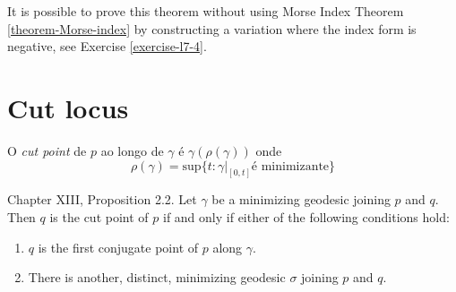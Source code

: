 It is possible to prove this theorem without
using Morse Index Theorem
\ref{theorem-Morse-index} by constructing a
variation where the index form is
negative, see Exercise \ref{exercise-l7-4}.

\section{Cut locus}
\label{section-cut-locus}

\begin{definition}
\label{definition-cut-point}
O {\it cut point} de  $p$ ao longo de
$\gamma$ é $\gamma(\rho(\gamma))$
onde
$$
\rho(\gamma)=\text{sup}\{t:\gamma|_{[0,t]}
\text{
é minimizante}\}
$$

\end{definition}

\begin{proposition}
\label{proposition-cut-point-chara}
\cite{doc} Chapter XIII, Proposition 2.2. Let
$\gamma$ be a minimizing geodesic joining $p$
and $q$. Then $q$ is the cut
point of $p$ if and only if either of the
following conditions hold:
\begin{enumerate}
\item $q$ is the first conjugate point of $p$
along $\gamma$.
\item There is another, distinct, minimizing
geodesic $\sigma$ joining $p$ and
 $q$.
\end{enumerate}
\end{proposition}

